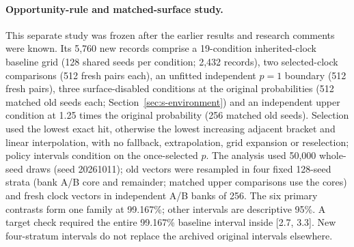 \documentclass[11pt]{article}
\begin{document}
\paragraph{Opportunity-rule and matched-surface study.}
This separate study was frozen after the earlier results and research comments
were known. Its 5,760 new records comprise a 19-condition inherited-clock
baseline grid (128 shared seeds per condition; 2,432 records), two
selected-clock comparisons (512 fresh pairs each), an unfitted independent $p=1$
boundary (512 fresh pairs), three surface-disabled conditions at the original
probabilities (512 matched old seeds each; Section~\ref{sec:s-environment}) and
an independent upper condition at 1.25 times the original probability (256
matched old seeds). Selection used the lowest exact hit, otherwise the lowest
increasing adjacent bracket and linear interpolation, with no fallback,
extrapolation, grid expansion or reselection; policy intervals condition on the
once-selected $p$. The analysis used 50,000 whole-seed draws (seed 20261011);
old vectors were resampled in four fixed 128-seed strata (bank A/B core and
remainder; matched upper comparisons use the cores) and fresh clock vectors in
independent A/B banks of 256. The six primary contrasts form one family at
99.167\%; other intervals are descriptive 95\%. A target check required the
entire 99.167\% baseline interval inside [2.7, 3.3]. New four-stratum intervals
do not replace the archived original intervals elsewhere.
\end{document}
